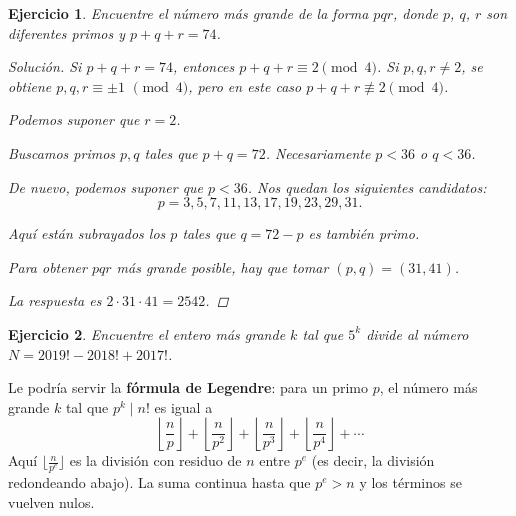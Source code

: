 \documentclass{article}
\theoremstyle{plain}
\newtheorem{ejercicio}{Ejercicio}
\newenvironment{solucion}{\begin{proof}[Solución]}{\end{proof}}
\begin{document}
\begin{ejercicio}
Encuentre el número más grande de la forma $pqr$, donde
$p$, $q$, $r$ son diferentes primos y $p + q + r = 74$.

\ifdefined\solutions
\begin{solucion}
    Si $p + q + r = 74$, entonces
    $p + q + r \equiv 2 \pmod{4}$.
    Si $p, q, r \ne 2$, se obtiene $p,q,r \equiv \pm 1$ $\pmod{4}$,
    pero en este caso $p + q + r \not\equiv 2 \pmod{4}$.

    Podemos suponer que $r = 2$.

    Buscamos primos $p, q$ tales que $p + q = 72$.
    Necesariamente $p < 36$ o $q < 36$.

    De nuevo, podemos suponer que $p < 36$. Nos quedan los siguientes candidatos:
    \[ p = 3, \boxed{5}, 7, \boxed{11}, \boxed{13}, 17, \boxed{19}, 23, \boxed{29}, \boxed{31}. \]

    Aquí están subrayados los $p$ tales que $q = 72 - p$ es también primo.

    Para obtener $pqr$ más grande posible, hay que tomar $(p,q) = (31,41)$.

    La respuesta es $2\cdot 31\cdot 41 = 2542$.
\end{solucion}
\fi
\end{ejercicio}

\pagebreak

\begin{ejercicio}
Encuentre el entero más grande $k$ tal que $5^k$ divide al número
$N = 2019! - 2018! + 2017!$.
\end{ejercicio}

Le podría servir la \textbf{fórmula de Legendre}: para un primo $p$,
el número más grande $k$ tal que $p^k \mid n!$ es igual a
\[
    \left\lfloor\frac{n}{p}\right\rfloor +
    \left\lfloor\frac{n}{p^2}\right\rfloor +
    \left\lfloor\frac{n}{p^3}\right\rfloor +
    \left\lfloor\frac{n}{p^4}\right\rfloor +
    \cdots
\]
Aquí $\lfloor\frac{n}{p^e}\rfloor$ es la división con residuo de $n$ entre $p^e$
(es decir, la división redondeando abajo). La suma continua hasta que $p^e > n$
y los términos se vuelven nulos.
\end{document}
